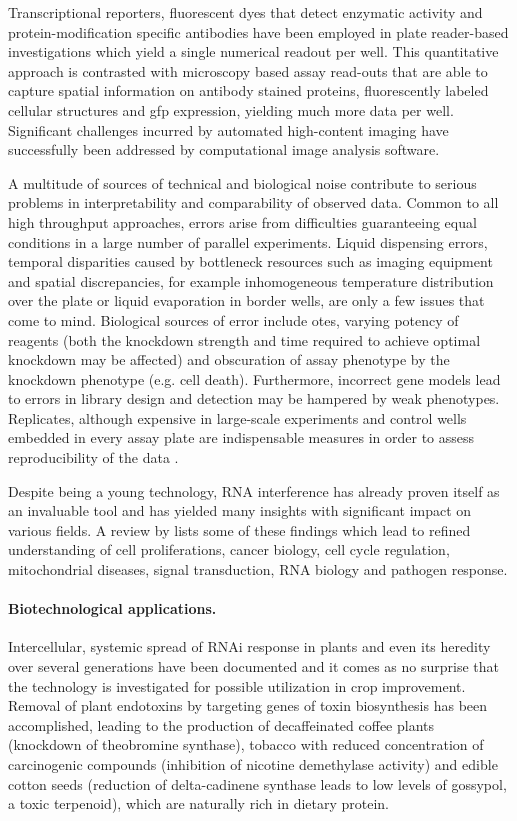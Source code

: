 Transcriptional reporters, fluorescent dyes that detect enzymatic activity and protein-modification specific antibodies have been employed in plate reader-based investigations which yield a single numerical readout per well. This quantitative approach is contrasted with microscopy based assay read-outs that are able to capture spatial information on antibody stained proteins, fluorescently labeled cellular structures and \gls{gfp} expression, yielding much more data per well. Significant challenges incurred by automated high-content imaging have successfully been addressed by computational image analysis software.

A multitude of sources of technical and biological noise contribute to serious problems in interpretability and comparability of observed data. Common to all high throughput approaches, errors arise from difficulties guaranteeing equal conditions in a large number of parallel experiments. Liquid dispensing errors, temporal disparities caused by bottleneck resources such as imaging equipment and spatial discrepancies, for example inhomogeneous temperature distribution over the plate or liquid evaporation in border wells, are only a few issues that come to mind. Biological sources of error include \glspl{ote}, varying potency of reagents (both the knockdown strength and time required to achieve optimal knockdown may be affected) and obscuration of assay phenotype by the knockdown phenotype (e.g. cell death). Furthermore, incorrect gene models lead to errors in library design and detection may be hampered by weak phenotypes. Replicates, although expensive in large-scale experiments and control wells embedded in every assay plate are indispensable measures in order to assess reproducibility of the data \citep{Echeverri2006,Perrimon2007}.

Despite being a young technology, RNA interference has already proven itself as an invaluable tool and has yielded many insights with significant impact on various fields. A review by \cite{Mohr2010} lists some of these findings which lead to refined understanding of cell proliferations, cancer biology, cell cycle regulation, mitochondrial diseases, signal transduction, RNA biology and pathogen response. 

\paragraph{Biotechnological applications.}
Intercellular, systemic spread of RNAi response in plants and even its heredity over several generations have been documented and it comes as no surprise that the technology is investigated for possible utilization in crop improvement. Removal of plant endotoxins by targeting genes of toxin biosynthesis has been accomplished, leading to the production of decaffeinated coffee plants (knockdown of theobromine synthase), tobacco with reduced concentration of carcinogenic compounds (inhibition of nicotine demethylase activity) and edible cotton seeds (reduction of delta-cadinene synthase leads to low levels of gossypol, a toxic terpenoid), which are naturally rich in dietary protein.

